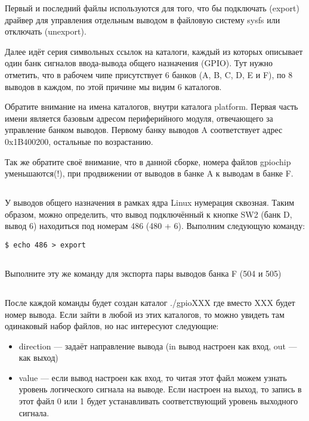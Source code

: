 Первый и последний файлы используются для того, что бы подключать (export) драйвер для управления отдельным выводом в файловую систему sysfs или отключать (unexport). 

Далее идёт серия символьных ссылок на каталоги, каждый из которых описывает один банк сигналов ввода-вывода общего назначения (GPIO). Тут нужно отметить, что в рабочем чипе присутствует 6 банков (A, B, C, D, E и F), по 8 выводов в каждом, по этой причине мы видим 6 каталогов.  

Обратите внимание на имена каталогов, внутри каталога platform. Первая часть имени является базовым адресом периферийного модуля, отвечающего за управление банком выводов. Первому банку выводов A соответствует адрес 0x1B400200, остальные по возрастанию. 

Так же обратите своё внимание, что в данной сборке, номера файлов gpiochip уменьшаются(!), при продвижении от выводов в банке A к выводам в банке F.

\subsection{}У выводов общего назначения в рамках ядра Linux нумерация сквозная. Таким образом, можно определить, что вывод подключённый к кнопке SW2 (банк D, вывод 6) находиться под номерам 486 (480 + 6).  Выполним следующую команду:
\begin{lstlisting}[style=bash]
$ echo 486 > export
\end{lstlisting}

\subsection{}Выполните эту же команду для экспорта пары выводов банка F (504 и 505) 

\subsection{}После каждой команды будет создан каталог ./gpioXXX где вместо XXX будет номер вывода. Если зайти в любой из этих каталогов, то можно увидеть там одинаковый набор файлов, но нас интересуют следующие: 
\begin{itemize}
\item direction — задаёт направление вывода (in вывод настроен как вход, out — как выход)
\item value — если вывод настроен как вход, то читая этот файл можем узнать уровень логического сигнала на выводе. Если настроен на выход, то запись в этот файл 0 или 1 будет устанавливать соответствующий уровень выходного сигнала.
\end{itemize}

